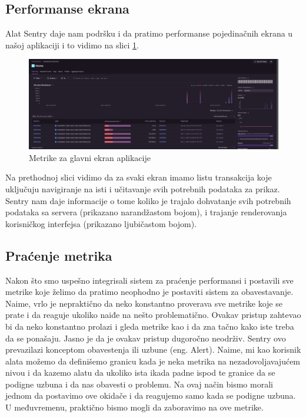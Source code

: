 \documentclass[12pt,oneside]{memoir}
\begin{document}
\subsection{Performanse ekrana}

Alat Sentry daje nam podršku i da pratimo performanse pojedinačnih ekrana u našoj aplikaciji i to vidimo na slici \ref{fig:mainScreenMetrics}.

\begin{figure}[h]
    \centering
    \includegraphics[scale=0.2]{docs/images/chapterFive/sentryHomeScreen.png}
    \caption{Metrike za glavni ekran aplikacije}
    \label{fig:mainScreenMetrics}
\end{figure}

Na prethodnoj slici vidimo da za svaki ekran imamo listu transakcija koje uključuju navigiranje na isti i učitavanje svih potrebnih podataka za prikaz. Sentry nam daje informacije o tome koliko je trajalo dohvatanje svih potrebnih podataka sa servera (prikazano narandžastom bojom), i trajanje renderovanja korisničkog interfejsa (prikazano ljubičastom bojom).

\subsection{Praćenje metrika}

Nakon što smo uspešno integrisali sistem za praćenje performansi i postavili sve metrike koje želimo da pratimo neophodno je postaviti sistem za obavestavanje. Naime, vrlo je nepraktično da neko konstantno proverava sve metrike koje se prate i da reaguje ukoliko naiđe na nešto problematično. Ovakav pristup zahtevao bi da neko konstantno prolazi i gleda metrike kao i da zna tačno kako iste treba da se ponašaju. Jasno je da je ovakav pristup dugoročno neodrživ. Sentry ovo prevazilazi konceptom obavestenja ili uzbune (eng. Alert). Naime, mi kao korisnik alata možemo da definišemo granicu kada je neka metrika na nezadovoljavajućem nivou i da kazemo alatu da ukoliko ista ikada padne ispod te granice da se podigne uzbuna i da nas obavesti o problemu. Na ovaj način bismo morali jednom da postavimo ove okidače i da reagujemo samo kada se podigne uzbuna. U međuvremenu, praktično bismo mogli da zaboravimo na ove metrike.
\end{document}
